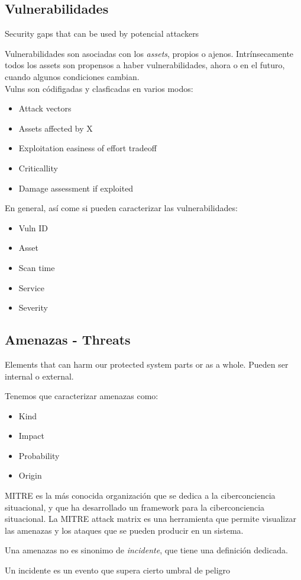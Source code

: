 \subsection{Vulnerabilidades}
\begin{definition}
   [Vulnerabilities]
   Security gaps that can be used by potencial attackers
\end{definition}

Vulnerabilidades son asociadas con los \textit{assets}, propios o ajenos. Intrínsecamente todos los assets son propensos a haber vulnerabilidades, ahora o en el futuro, cuando algunos condiciones cambian.\\
Vulns son códifigadas y clasficadas en varios modos:
\begin{itemize}
   \item Attack vectors
   \item Assets affected by X
   \item Exploitation easiness of effort tradeoff
   \item Criticallity
   \item Damage assessment if exploited
\end{itemize}

En general, así come si pueden caracterizar las vulnerabilidades:
\begin{itemize}
   \item Vuln ID
   \item Asset
   \item Scan time
   \item Service
   \item Severity
\end{itemize}

\subsection{Amenazas - Threats}
\begin{definition}
   [Threats]
   Elements that can harm our protected system parts or as a whole. Pueden ser internal o external.
\end{definition}

{Tenemos que caracterizar amenazas como:\ns
\begin{itemize}
   \item Kind
   \item Impact
   \item Probability
   \item Origin
\end{itemize}}

MITRE es la más conocida organización que se dedica a la ciberconciencia situacional, y que ha desarrollado un framework para la ciberconciencia situacional.
La MITRE attack matrix es una herramienta que permite visualizar las amenazas y los ataques que se pueden producir en un sistema.

Una amenazas no es sinonimo de \textit{incidente}, que tiene una definición dedicada.
\begin{definition}
   [Incident]
   Un incidente es un evento que supera cierto umbral de peligro
\end{definition}



